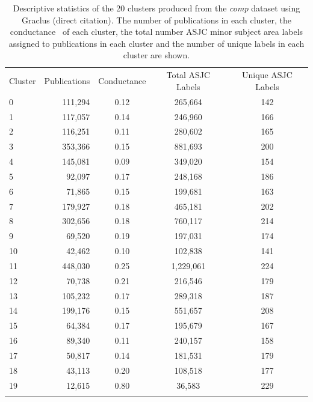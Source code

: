 \begin{table}[ht]
\caption{Descriptive statistics of the 20 clusters produced from the \emph{comp} dataset using Graclus (direct citation).  The number of publications in each cluster, the conductance~\cite{shun_parallel_2016} of each cluster, the total number ASJC minor subject area labels assigned to publications in each cluster and the number of 
unique labels in each cluster are shown.}
\label{tab:graclus}       
\begin{tabular}{lrccc}
\hline\noalign{\smallskip}
Cluster & Publications & Conductance & Total ASJC Labels & Unique ASJC Labels\\
\noalign{\smallskip}\hline\noalign{\smallskip}
0 & 111,294 & 0.12 & 265,664 & 142 \\ 
1 & 117,057 & 0.14 & 246,960 & 166 \\ 
2 & 116,251 & 0.11 & 280,602 & 165 \\ 
3 & 353,366 & 0.15 & 881,693 & 200 \\ 
4 & 145,081 & 0.09 & 349,020 & 154 \\ 
5 & 92,097 & 0.17 & 248,168 & 186 \\ 
6 & 71,865 & 0.15 & 199,681 & 163 \\ 
7 & 179,927 & 0.18 & 465,181 & 202 \\ 
8 & 302,656 & 0.18 & 760,117 & 214 \\ 
9 & 69,520 & 0.19 & 197,031 & 174 \\ 
10 & 42,462 & 0.10 & 102,838 & 141 \\ 
11 & 448,030 & 0.25 & 1,229,061 & 224 \\ 
12 & 70,738 & 0.21 & 216,546 & 179 \\ 
13 & 105,232 & 0.17 & 289,318 & 187 \\ 
14 & 199,176 & 0.15 & 551,657 & 208 \\ 
15 & 64,384 & 0.17 & 195,679 & 167 \\ 
16 & 89,340 & 0.11 & 240,157 & 158 \\ 
17 & 50,817 & 0.14 & 181,531 & 179 \\ 
18 & 43,113 & 0.20 & 108,518 & 177 \\ 
19 & 12,615 & 0.80 & 36,583 & 229 \\ 
\noalign{\smallskip}\hline
\end{tabular}
\end{table}
\newpage

